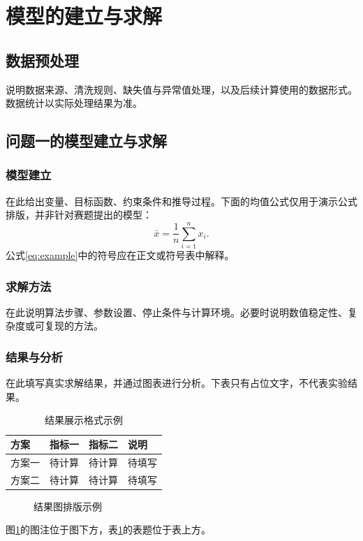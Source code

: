 \section{模型的建立与求解}
\subsection{数据预处理}
说明数据来源、清洗规则、缺失值与异常值处理，以及后续计算使用的数据形式。数据统计以实际处理结果为准。

\subsection{问题一的模型建立与求解}
\subsubsection{模型建立}
在此给出变量、目标函数、约束条件和推导过程。下面的均值公式仅用于演示公式排版，并非针对赛题提出的模型：
\begin{equation}
  \bar{x}=\frac{1}{n}\sum_{i=1}^{n}x_i .
  \label{eq:example}
\end{equation}
公式\eqref{eq:example}中的符号应在正文或符号表中解释。

\subsubsection{求解方法}
在此说明算法步骤、参数设置、停止条件与计算环境。必要时说明数值稳定性、复杂度或可复现的方法。

\subsubsection{结果与分析}
在此填写真实求解结果，并通过图表进行分析。下表只有占位文字，不代表实验结果。
\begin{table}[htbp]
  \centering
  \caption{结果展示格式示例}
  \label{tab:results}
  \begin{tabularx}{\textwidth}{lXXX}
    \toprule
    方案 & 指标一 & 指标二 & 说明 \\
    \midrule
    方案一 & 待计算 & 待计算 & 待填写 \\
    方案二 & 待计算 & 待计算 & 待填写 \\
    \bottomrule
  \end{tabularx}
\end{table}

\begin{figure}[htbp]
  \centering
  \caption{结果图排版示例}
  \label{fig:example}
\end{figure}
图\ref{fig:example}的图注位于图下方，表\ref{tab:results}的表题位于表上方。

